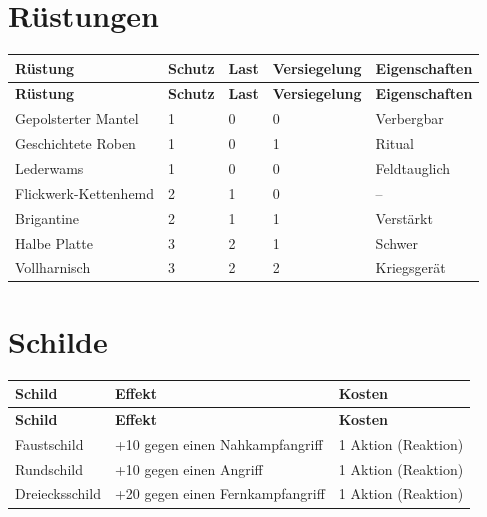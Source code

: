 \section{Rüstungen}
\begin{longtable}{p{}p{}p{}p{}p{}}
    \toprule
    \textbf{Rüstung} & \textbf{Schutz} & \textbf{Last} & \textbf{Versiegelung} & \textbf{Eigenschaften} \\
    \midrule
    \endfirsthead
    \toprule
    \textbf{Rüstung} & \textbf{Schutz} & \textbf{Last} & \textbf{Versiegelung} & \textbf{Eigenschaften} \\
    \midrule
    \endhead

    Gepolsterter Mantel & 1 & 0 & 0 & Verbergbar \\
    Geschichtete Roben  & 1 & 0 & 1 & Ritual \\
    Lederwams           & 1 & 0 & 0 & Feldtauglich \\
    Flickwerk-Kettenhemd & 2 & 1 & 0 & -- \\
    Brigantine          & 2 & 1 & 1 & Verstärkt \\
    Halbe Platte        & 3 & 2 & 1 & Schwer \\
    Vollharnisch        & 3 & 2 & 2 & Kriegsgerät \\

    \bottomrule
\end{longtable}


\section{Schilde}
\begin{longtable}{p{}p{}p{}}
    \toprule
    \textbf{Schild} & \textbf{Effekt} & \textbf{Kosten} \\
    \midrule
    \endfirsthead
    \toprule
    \textbf{Schild} & \textbf{Effekt} & \textbf{Kosten} \\
    \midrule
    \endhead

    Faustschild & +10 gegen einen Nahkampfangriff & 1 Aktion (Reaktion) \\
    Rundschild & +10 gegen einen Angriff & 1 Aktion (Reaktion) \\
    Dreiecksschild & +20 gegen einen Fernkampfangriff & 1 Aktion (Reaktion) \\

    \bottomrule
\end{longtable}
